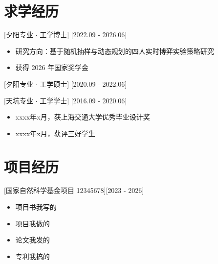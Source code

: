 \documentclass{resume}
\begin{document}


\ResumeTitle


\section{求学经历}
[夕阳专业 $\cdot$ 工学博士]
[2022.09 - 2026.06]
\begin{itemize}
\item 研究方向：基于随机抽样与动态规划的四人实时博弈实验策略研究
\item 获得 2026 年国家奖学金
\end{itemize}


[夕阳专业 $\cdot$ 工学硕士]
[2020.09 - 2022.06]

[天坑专业 $\cdot$ 工学学士]
[2016.09 - 2020.06]
\begin{itemize}
\item xxxx年x月，获上海交通大学优秀毕业设计奖
\item xxxx年x月，获评三好学生
\end{itemize}


\section{项目经历}

[国家自然科学基金项目 12345678][2023 - 2026]
\begin{itemize}
  \item 项目书我写的
  \item 项目我做的
  \item 论文我发的
  \item 专利我搞的
\end{itemize}
\end{document}
